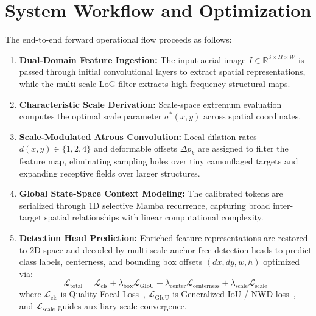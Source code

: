 \documentclass[12pt,a4paper]{report}
\begin{document}
\section{System Workflow and Optimization}
The end-to-end forward operational flow proceeds as follows:
\begin{enumerate}
    \item \textbf{Dual-Domain Feature Ingestion:} The input aerial image $I \in \mathbb{R}^{3 \times H \times W}$ is passed through initial convolutional layers to extract spatial representations, while the multi-scale LoG filter extracts high-frequency structural maps.
    \item \textbf{Characteristic Scale Derivation:} Scale-space extremum evaluation computes the optimal scale parameter $\sigma^*(x, y)$ across spatial coordinates.
    \item \textbf{Scale-Modulated Atrous Convolution:} Local dilation rates $d(x, y) \in \{1, 2, 4\}$ and deformable offsets $\Delta p_k$ are assigned to filter the feature map, eliminating sampling holes over tiny camouflaged targets and expanding receptive fields over larger structures.
    \item \textbf{Global State-Space Context Modeling:} The calibrated tokens are serialized through 1D selective Mamba recurrence, capturing broad inter-target spatial relationships with linear computational complexity.
    \item \textbf{Detection Head Prediction:} Enriched feature representations are restored to 2D space and decoded by multi-scale anchor-free detection heads to predict class labels, centerness, and bounding box offsets $(dx, dy, w, h)$ optimized via:
    \begin{equation}
        \mathcal{L}_{\text{total}} = \mathcal{L}_{\text{cls}} + \lambda_{\text{box}} \mathcal{L}_{\text{GIoU}} + \lambda_{\text{center}} \mathcal{L}_{\text{centerness}} + \lambda_{\text{scale}} \mathcal{L}_{\text{scale}}
    \end{equation}
    where $\mathcal{L}_{\text{cls}}$ is Quality Focal Loss~\cite{lin2017focal}, $\mathcal{L}_{\text{GIoU}}$ is Generalized IoU / NWD loss~\cite{wang2021normalized}, and $\mathcal{L}_{\text{scale}}$ guides auxiliary scale convergence.
\end{enumerate}




\end{document}
